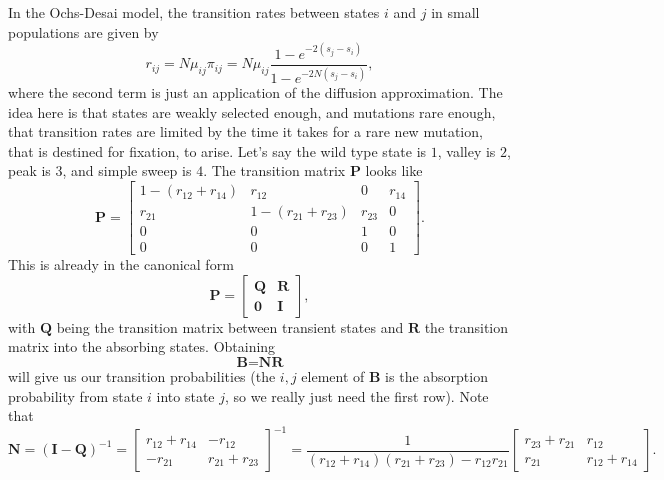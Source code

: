 \documentclass[10pt]{revtex4}
\begin{document}
In the Ochs-Desai model, the transition rates between states $i$ and $j$ in small populations are given by
\begin{equation}
r_{ij} = N\mu_{ij}\pi_{ij} = N\mu_{ij}\frac{1-e^{-2(s_j-s_i)}}{1-e^{-2N(s_j-s_i)}},
\end{equation}
where the second term is just an application of the diffusion approximation.
The idea here is that states are weakly selected enough, and mutations rare enough, that transition rates are limited by the time it takes for a rare new mutation, that is destined for fixation, to arise.
Let's say the wild type state is $1$, valley is $2$, peak is $3$, and simple sweep is $4$.
The transition matrix $\textbf{P}$ looks like
\begin{equation}
\textbf{P} = 
\begin{bmatrix}
1-(r_{12} + r_{14}) & r_{12} & 0 & r_{14}  \\
r_{21} & 1 - (r_{21} + r_{23}) & r_{23} & 0 \\
0 & 0 & 1 & 0 \\
0 & 0 & 0 & 1
\end{bmatrix}.
\end{equation}
This is already in the canonical form
\begin{equation}
\textbf{P} = 
\begin{bmatrix}
\textbf{Q} & \textbf{R} \\
\textbf{0} & \textbf{I}
\end{bmatrix},
\end{equation}
with $\textbf{Q}$ being the transition matrix between transient states and $\textbf{R}$ the transition matrix into the absorbing states.
Obtaining
\begin{equation}
\textbf{B} = \textbf{N}\textbf{R}
\end{equation}
will give us our transition probabilities (the $i, j$ element of \textbf{B} is the absorption probability from state $i$ into state $j$, so we really just need the first row).
Note that 
\begin{equation}
\textbf{N} = (\textbf{I} - \textbf{Q})^{-1} = 
\begin{bmatrix}
r_{12} + r_{14} & -r_{12}\\
-r_{21} & r_{21} + r_{23}
\end{bmatrix}^{-1} = 
\frac{1}{(r_{12} + r_{14})(r_{21} + r_{23}) - r_{12}r_{21}}
\begin{bmatrix}
r_{23} + r_{21} & r_{12}\\
r_{21} & r_{12} + r_{14}
\end{bmatrix}.
\end{equation}
\end{document}
